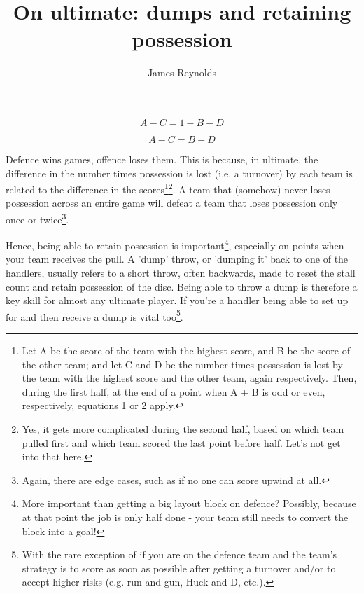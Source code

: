 \documentclass{tufte-handout}
\title{On ultimate: dumps and retaining possession}
\author[James Reynolds]{James Reynolds}
\begin{document}
\maketitle%





\begin{marginfigure}
\begin{equation}
A - C = 1 - B - D
\end{equation}
\end{marginfigure}
\begin{marginfigure}
\begin{equation}
A - C = B - D
\end{equation}
\end{marginfigure}

Defence wins games, 
offence loses them. 
This is because,
in ultimate,
the difference
in the number 
times possession
is lost 
(i.e. a turnover)
by each team
is related to 
the difference in 
the scores\footnote{
Let A 
be the score of 
the team with the
highest score,
and  B be the 
score of the 
other team; 
and let 
C and D
be the number
times possession
is lost 
by the team
with the highest score
and the other team, 
again respectively. 
Then, 
during the first half, 
at the end 
of a point when 
A + B is odd
or even, 
respectively, 
equations 1 
or 2 
apply.}\footnote{
Yes, 
it gets more complicated 
during the second half,
based on 
which team 
pulled first 
and which 
team scored 
the last point 
before half.  
Let's not 
get into that here.}. 
A team 
that (somehow)
never loses 
possession across
an entire game 
will defeat 
a team 
that loses possession 
only once or twice\footnote{
Again, 
there are edge cases, 
such as if 
no one can score 
upwind at all.}.


 
Hence, 
being able 
to retain possession 
is important\footnote{
More important than getting 
a big layout block on 
defence? Possibly, 
because at that point 
the job 
is only half done - 
your team still 
needs to convert 
the block into a goal!},
especially on 
points when 
your team 
receives 
the pull. 
A 'dump' throw,
or 'dumping it' 
back to one of the handlers, 
usually refers 
to a short 
throw, 
often backwards,
made to 
reset the stall count 
and retain possession 
of the disc. 
Being able 
to throw a dump 
is therefore a 
key skill 
for almost any
ultimate player. 
If you're a handler 
being able to 
set up for 
and then receive a dump 
is vital too\footnote{
With the rare exception of 
if you are on the defence team 
and the team's strategy is 
to score 
as soon as possible 
after getting a turnover 
and/or to accept 
higher risks
(e.g. run and gun, 
Huck and D,  
etc.).}.
\end{document}
